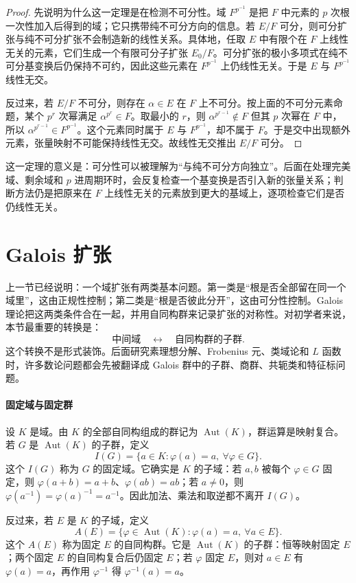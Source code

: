 \documentclass[11pt,a4paper,openany]{ctexbook}
\numberwithin{equation}{chapter}
\theoremstyle{plain}
\theoremstyle{definition}
\theoremstyle{remark}
\begin{document}
\begin{proof}
先说明为什么这一定理是在检测不可分性。域 $F^{p^{-1}}$ 是把 $F$ 中元素的 $p$ 次根一次性加入后得到的域；它只携带纯不可分方向的信息。若 $E/F$ 可分，则可分扩张与纯不可分扩张不会制造新的线性关系。具体地，任取 $E$ 中有限个在 $F$ 上线性无关的元素，它们生成一个有限可分子扩张 $E_0/F$。可分扩张的极小多项式在纯不可分基变换后仍保持不可约，因此这些元素在 $F^{p^{-1}}$ 上仍线性无关。于是 $E$ 与 $F^{p^{-1}}$ 线性无交。

反过来，若 $E/F$ 不可分，则存在 $\alpha\in E$ 在 $F$ 上不可分。按上面的不可分元素命题，某个 $p^r$ 次幂满足 $\alpha^{p^r}\in F$。取最小的 $r$，则 $\alpha^{p^{r-1}}\notin F$ 但其 $p$ 次幂在 $F$ 中，所以 $\alpha^{p^{r-1}}\in F^{p^{-1}}$。这个元素同时属于 $E$ 与 $F^{p^{-1}}$，却不属于 $F$。于是交中出现额外元素，张量映射不可能保持线性无交。故线性无交推出 $E/F$ 可分。
\end{proof}

这一定理的意义是：可分性可以被理解为“与纯不可分方向独立”。后面在处理完美域、剩余域和 $p$ 进周期环时，会反复检查一个基变换是否引入新的张量关系；判断方法仍是把原来在 $F$ 上线性无关的元素放到更大的基域上，逐项检查它们是否仍线性无关。

\section{Galois 扩张}
上一节已经说明：一个域扩张有两类基本问题。第一类是“根是否全部留在同一个域里”，这由正规性控制；第二类是“根是否彼此分开”，这由可分性控制。Galois 理论把这两类条件合在一起，并用自同构群来记录扩张的对称性。对初学者来说，本节最重要的转换是：
\[
\text{中间域}\quad \longleftrightarrow\quad \text{自同构群的子群}.
\]
这个转换不是形式装饰。后面研究素理想分解、Frobenius 元、类域论和 $L$ 函数时，许多数论问题都会先被翻译成 Galois 群中的子群、商群、共轭类和特征标问题。

\paragraph{固定域与固定群}
设 $K$ 是域。由 $K$ 的全部自同构组成的群记为 $\operatorname{Aut}(K)$，群运算是映射复合。若 $G$ 是 $\operatorname{Aut}(K)$ 的子群，定义
\[
I(G)=\{a\in K:\varphi(a)=a,\ \forall \varphi\in G\}.
\]
这个 $I(G)$ 称为 $G$ 的固定域。它确实是 $K$ 的子域：若 $a,b$ 被每个 $\varphi\in G$ 固定，则 $\varphi(a+b)=a+b$、$\varphi(ab)=ab$；若 $a\ne0$，则 $\varphi(a^{-1})=\varphi(a)^{-1}=a^{-1}$。因此加法、乘法和取逆都不离开 $I(G)$。

反过来，若 $E$ 是 $K$ 的子域，定义
\[
A(E)=\{\varphi\in\operatorname{Aut}(K):\varphi(a)=a,\ \forall a\in E\}.
\]
这个 $A(E)$ 称为固定 $E$ 的自同构群。它是 $\operatorname{Aut}(K)$ 的子群：恒等映射固定 $E$；两个固定 $E$ 的自同构复合后仍固定 $E$；若 $\varphi$ 固定 $E$，则对 $a\in E$ 有 $\varphi(a)=a$，再作用 $\varphi^{-1}$ 得 $\varphi^{-1}(a)=a$。
\end{document}
